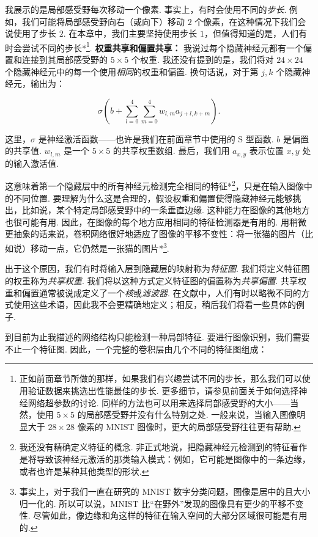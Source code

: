 我展示的是局部感受野每次移动一个像素. 事实上，有时会使用不同的\emph{步长}. 例如，我们可能将局部感受野向右（或向下）移动 $2$ 个像素，在这种情况下我们会说使用了步长 $2$. 在本章中，我们主要坚持使用步长 $1$，但值得知道的是，人们有时会尝试不同的步长*\footnote{正如前面章节所做的那样，如果我们有兴趣尝试不同的步长，那么我们可以使用验证数据来挑选出性能最佳的步长. 更多细节，请参见前面关于如何选择神经网络超参数的讨论. 同样的方法也可以用来选择局部感受野的大小——当然，使用 $5 \times 5$ 的局部感受野并没有什么特别之处. 一般来说，当输入图像明显大于 $28 \times 28$ 像素的 MNIST 图像时，更大的局部感受野往往更有帮助.}. \textbf{权重共享\label{term:71}和偏置共享：} 我说过每个隐藏神经元都有一个偏置和连接到其局部感受野的 $5 \times 5$ 个权重. 我还没有提到的是，我们将对 $24 \times 24$ 个隐藏神经元中的每一个使用\emph{相同}的权重和偏置. 换句话说，对于第 $j, k$ 个隐藏神经元，输出为：

\begin{equation}
\sigma\left(b + \sum_{l=0}^4 \sum_{m=0}^4 w_{l,m} a_{j+l, k+m} \right).
\tag{125}
\end{equation}

\noindent 这里，$\sigma$ 是神经激活函数——也许是我们在前面章节中使用的 S 型函数. $b$ 是偏置的共享值. $w_{l,m}$ 是一个 $5 \times 5$ 的共享权重数组. 最后，我们用 $a_{x, y}$ 表示位置 $x, y$ 处的输入激活值.

这意味着第一个隐藏层中的所有神经元检测完全相同的特征*\footnote{我还没有精确定义特征的概念. 非正式地说，把隐藏神经元检测到的特征看作是将导致该神经元激活的那类输入模式：例如，它可能是图像中的一条边缘，或者也许是某种其他类型的形状.}，只是在输入图像中的不同位置. 要理解为什么这是合理的，假设权重和偏置使得隐藏神经元能够挑出，比如说，某个特定局部感受野中的一条垂直边缘. 这种能力在图像的其他地方也很可能有用. 因此，在图像的每个地方应用相同的特征检测器是有用的. 用稍微更抽象的话来说，卷积网络很好地适应了图像的平移不变性：将一张猫的图片（比如说）移动一点，它仍然是一张猫的图片*\footnote{事实上，对于我们一直在研究的 MNIST 数字分类问题，图像是居中的且大小归一化的. 所以可以说，MNIST 比``在野外''发现的图像具有更少的平移不变性. 尽管如此，像边缘和角这样的特征在输入空间的大部分区域很可能是有用的.}.

出于这个原因，我们有时将输入层到隐藏层的映射称为\emph{特征图}. 我们将定义特征图的权重称为\emph{共享权重}. 我们将以这种方式定义特征图的偏置称为\emph{共享偏置}. 共享权重和偏置通常被说成定义了一个\emph{核}或\emph{滤波器}. 在文献中，人们有时以略微不同的方式使用这些术语，因此我不会更精确地定义；相反，稍后我们将看一些具体的例子.

到目前为止我描述的网络结构只能检测一种局部特征. 要进行图像识别，我们需要不止一个特征图\label{term:73}. 因此，一个完整的卷积层\label{term:72}由几个不同的特征图组成：

